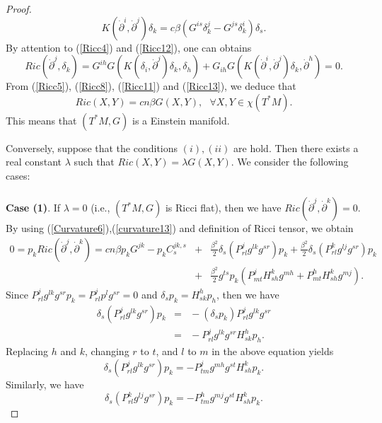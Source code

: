 \documentclass[10pt,a4paper]{article}
\theoremstyle{plain}
\theoremstyle{definition}
\begin{document}
\begin{proof}
\begin{equation}
K({\dot{\partial}}^i,{\dot{\partial}}^j)\delta_k=c\beta(G^{is}\delta^j_k-G^{js}\delta^i_k)\delta_s.\label{Ricc12}
\end{equation}
By attention to (\ref{Ricc4}) and (\ref{Ricc12}), one can obtains
\begin{equation}
Ric({\dot{\partial}}^j,\delta_k)=G^{ih}G(K(\delta_i,{\dot{\partial}}^j)\delta_k,\delta_h)
+G_{ih}G(K({\dot{\partial}}^i,{\dot{\partial}}^j)\delta_k,{\dot{\partial}}^h)=0.\label{Ricc13}
\end{equation}
From (\ref{Ricc5}), (\ref{Ricc8}), (\ref{Ricc11}) and
(\ref{Ricc13}), we deduce that
\[
Ric(X,Y)=cn\beta G(X,Y),\ \ \ \forall X, Y\in\chi(T^{\ast}M).
\]
This means that $(T^{\ast}M,G)$ is a Einstein manifold.

Conversely, suppose that the conditions  $(i), (ii)$ are hold. Then there exists a real constant $\lambda$ such that $Ric(X,Y)=\lambda G(X,Y)$. We consider the following cases:\\\\
\textbf{Case (1)}. If $\lambda=0$ (i.e., $(T^{\ast}M,G)$ is Ricci
flat), then we have
$Ric({\dot{\partial}}^j,{\dot{\partial}}^k)=0$. By using
(\ref{Curvature6}),(\ref{curvature13}) and definition of Ricci
tensor, we obtain
\begin{eqnarray}
0=p_kRic({\dot{\partial}}^j,{\dot{\partial}}^k)=cn\beta
p_kG^{jk}- p_kC^{jk,s}_s\!\!\!\!&+&\!\!\!\!\frac{\beta^2}{2}\delta_s(P^j_{rl}g^{lk}g^{sr})p_k
+\frac{\beta^2}{2}\delta_s(P^k_{rl}g^{lj}g^{sr})p_k\nonumber\\
\!\!\!\!&+&\!\!\!\!
\frac{\beta^2}{2}g^{ts}p_k(P^j_{mt}H^k_{sh}g^{mh}+P^h_{mt}H^k_{sh}g^{mj}).\label{Ricc14}
\end{eqnarray}
Since $P^j_{rl}g^{lk}g^{sr}p_k=P^j_{rl}p^lg^{sr}=0$ and
$\delta_sp_k=H^h_{sk}p_h$, then we have
\begin{eqnarray*}
\delta_s(P^j_{rl}g^{lk}g^{sr})p_k\!\!\!\!&=&\!\!\!\!-(\delta_sp_k)P^j_{rl}g^{lk}g^{sr}\\
\!\!\!\!&=&\!\!\!\!-P^j_{rl}g^{lk}g^{sr}H^h_{sk}p_h.
\end{eqnarray*}
Replacing $h$ and $k$, changing $r$ to $t$, and $l$ to $m$ in the above equation yields
\begin{equation}
\delta_s(P^j_{rl}g^{lk}g^{sr})p_k=-P^j_{tm}g^{mh}g^{st}H^k_{sh}p_k.\label{Ricc15}
\end{equation}
Similarly, we have
\begin{equation}
\delta_s(P^k_{rl}g^{lj}g^{sr})p_k=-P^h_{tm}g^{mj}g^{st}H^k_{sh}p_k.\label{Ricc16}
\end{equation}

\end{proof}
\end{document}
